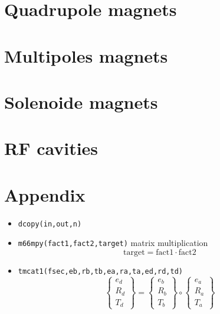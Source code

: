 \documentclass{cern-art} %
\renewcommand{\L}[1]{\lstinline[firstnumber=last]{#1}}
\begin{document}
\section{Quadrupole magnets}

\section{Multipoles magnets}

\section{Solenoide magnets}

\section{RF cavities}

\appendix
\section{Appendix}
\begin{itemize}
\item[-] \L{dcopy(in,out,n)}
\item[-] \L{m66mpy(fact1,fact2,target)} matrix multiplication $$\text{target} = \text{fact1} \cdot \text{fact2}$$
\item[-] \L{tmcat1(fsec,eb,rb,tb,ea,ra,ta,ed,rd,td)}$$\left\{ \begin{array}{c}
e_{d}\\
R_{d}\\
T_{d}
\end{array}\right\} =\left\{ \begin{array}{c}
e_{b}\\
R_{b}\\
T_{b}
\end{array}\right\} \circ \left\{ \begin{array}{c}
e_{a}\\
R_{a}\\
T_{a}
\end{array}\right\} $$
\end{itemize}
\end{document}
